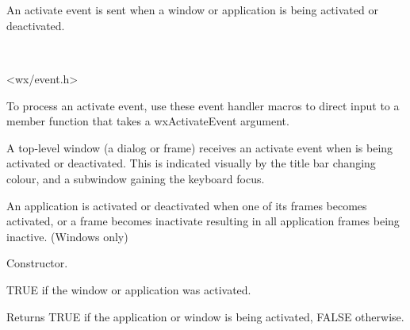 \section{}\label{wxactivateevent}

An activate event is sent when a window or application is being activated
or deactivated.


\\


<wx/event.h>


To process an activate event, use these event handler macros to direct input to a member
function that takes a wxActivateEvent argument.

\twocolwidtha{7cm}
\begin{twocollist}\itemsep=0pt
\end{twocollist}%


A top-level window (a dialog or frame) receives an activate event when is
being activated or deactivated. This is indicated visually by the title
bar changing colour, and a subwindow gaining the keyboard focus.

An application is activated or deactivated when one of its frames becomes activated,
or a frame becomes inactivate resulting in all application frames being inactive. (Windows only)


{}




Constructor.



TRUE if the window or application was activated.

\label{wxactivateeventgetactive}


Returns TRUE if the application or window is being activated, FALSE otherwise.

